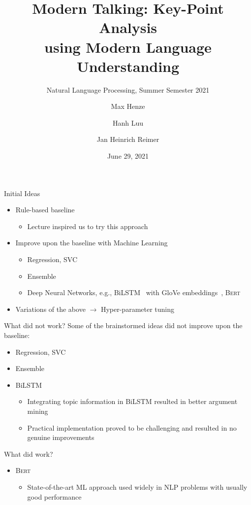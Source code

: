 \documentclass[english,handout]{mlutalk}
\title{%
  Modern Talking: Key-Point Analysis \\
  using Modern Language Understanding
}
\subtitle{Natural Language Processing, Summer Semester 2021}
\author{Max Henze \and Hanh Luu \and Jan Heinrich Reimer}
\institute{Martin Luther University Halle-Wittenberg}
\date{June 29, 2021}
\newcommand{\BiLSTM}{\mbox{BiLSTM}\xspace}
\newcommand{\Bert}{\textsc{Bert}\xspace}
\begin{document}
\titleframe

\begin{frame}[allowframebreaks]{Initial Ideas}
  
  \begin{itemize}
    \item Rule-based baseline 
      \begin{itemize}
        \item Lecture inspired us to try this approach
      \end{itemize}
    \item Improve upon the baseline with Machine Learning
    \begin{itemize}
      \item Regression, SVC~\cite{CortesV1995}
      \item Ensemble
      \item Deep Neural Networks, e.g., \BiLSTM~\cite{SchusterP1997,HochreiterS1997} with GloVe embeddings~\cite{PenningtonSM2014}, \Bert~\cite{DevlinCLT2018}
    \end{itemize}
    \item Variations of the above \(\to\) Hyper-parameter tuning
  \end{itemize}

  \framebreak
  
  \begin{block}{What did not work?}
    Some of the brainstormed ideas did not improve upon the baseline:
    \begin{itemize}
      \item Regression, SVC
      \item Ensemble
      \item \BiLSTM
      \begin{itemize}
        \item Integrating topic information in \BiLSTM resulted in better argument mining \cite{StabMSRG2018}
        \item Practical implementation proved to be challenging and resulted in no genuine improvements
      \end{itemize}
    \end{itemize}
  \end{block}
  
  \begin{block}{What did work?}
    \begin{itemize}
      \item \Bert
      \begin{itemize}
        \item State-of-the-art ML approach used widely in NLP problems with usually good performance
      \end{itemize}
    \end{itemize}
  \end{block}

\end{frame}
\end{document}
